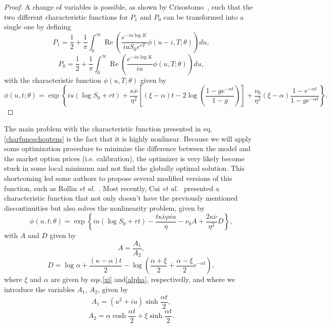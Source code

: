 \begin{proof}
A change of variables is possible, as shown by Crisostomo~\citep{Crisostomo}, such that the two different characteristic functions for $P_1$ and $P_0$ can be transformed into a single one by defining
\begin{equation}
P_1=\frac{1}{2}+\frac{1}{\pi}\int_0^\infty\operatorname{Re}\left(\frac{e^{-iu\log K}}{iuS_0e^{rT}}\phi(u-i,T;\theta)\right)du,
\end{equation}
\begin{equation}
P_0=\frac{1}{2}+\frac{1}{\pi}\int_0^\infty\operatorname{Re}\left(\frac{e^{-iu\log K}}{iu}\phi(u,T;\theta)\right)du,
\end{equation}
\noindent with the characteristic function $\phi(u,T;\theta)$ given by
\begin{equation}
\phi(u,t;\theta)=\exp\left\{iu\left(\log S_0+rt\right)+\frac{\kappa\overline{\nu}}{\eta^2}\left[\left(\xi-\alpha\right)t-2\log\left(\frac{1-ge^{-\alpha t}}{1-g}\right)\right]+\frac{\nu_0}{\eta^2}\left(\xi-\alpha\right)\frac{1-e^{-\alpha t}}{1-ge^{-\alpha t}}\right\}.
\end{equation}

\end{proof}



The main problem with the characteristic function presented in eq.\eqref{charfuncschoutens} is the fact that it is highly nonlinear. Because we will apply some optimization procedure to minimize the difference between the model and the market option prices (i.e. calibration), the optimizer is very likely become stuck in some local minimum and not find the globally optimal solution.
This shortcoming led some authors to propose several modified versions of this function, such as Rollin \textit{et al.}~\citep{Rollin}. Most recently, Cui \textit{et al.}~\citep{Cui} presented a characteristic function that not only doesn't have the previously mentioned discontinuities but also solves the nonlinearity problem, given by
\begin{equation}
\phi(u,t;\theta)=\exp\left\{iu\left(\log S_0+rt\right)-\frac{t\kappa\overline{\nu}\rho iu}{\eta}-\nu_0A+\frac{2\kappa\overline{\nu}}{\eta^2}D\right\},
\end{equation}
\noindent with $A$ and $D$ given by
\begin{equation}
A=\frac{A_1}{A_2},
\end{equation}
\begin{equation}
D=\log \alpha+\frac{(\kappa-\alpha) t}{2}-\log\left(\frac{\alpha+\xi}{2}+\frac{\alpha-\xi}{2}e^{-\alpha t}\right),
\end{equation}
\noindent where $\xi$ and $\alpha$ are given by eqs.\eqref{xi} and\eqref{alpha}, respectivelly, and where we introduce the variables $A_1$, $A_2$, given by
\begin{equation}
A_1=(u^2+iu)\sinh\frac{\alpha t}{2},
\end{equation}
\begin{equation}
A_2=\alpha\cosh\frac{\alpha t}{2}+\xi\sinh\frac{\alpha t}{2}.
\end{equation}

